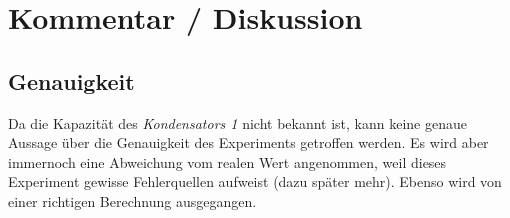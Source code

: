 \documentclass[a4paper,12pt]{article}
\begin{document}
\section{Kommentar / Diskussion}

\subsection{Genauigkeit}

Da die Kapazität des \textit{Kondensators 1} nicht bekannt ist, kann keine genaue Aussage über die Genauigkeit des Experiments getroffen werden. Es wird aber immernoch eine Abweichung vom realen Wert angenommen, weil dieses Experiment gewisse Fehlerquellen aufweist (dazu später mehr). Ebenso wird von einer richtigen Berechnung ausgegangen.\\









\end{document}
